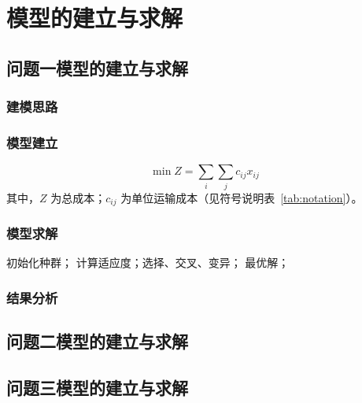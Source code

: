 \documentclass[UTF8,zihao=-4]{ctexart}
\begin{document}
\section{模型的建立与求解}
\subsection{问题一模型的建立与求解}
\subsubsection{建模思路}
\subsubsection{模型建立}
\begin{equation}
  \min Z = \sum_{i}\sum_{j} c_{ij} x_{ij}
  \label{eq:p1-obj}
\end{equation}
其中，$Z$ 为总成本；$c_{ij}$ 为单位运输成本（见符号说明表~\ref{tab:notation}）。
\subsubsection{模型求解}
\begin{algorithm}[H]
  \caption{求解算法}\label{alg:p1}
  \begin{algorithmic}[1]
    \State 初始化种群；
      \State 计算适应度；选择、交叉、变异；
    \EndWhile
    \State \Return 最优解；
  \end{algorithmic}
\end{algorithm}
\subsubsection{结果分析}

\subsection{问题二模型的建立与求解}
\subsection{问题三模型的建立与求解}
\end{document}
